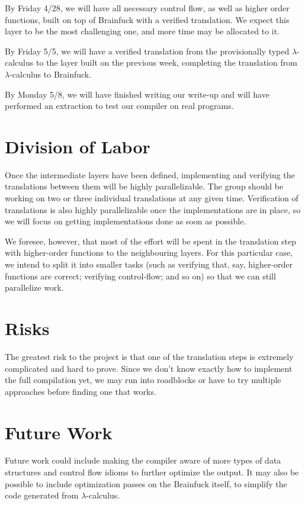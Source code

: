 \documentclass[letterpaper,twocolumn,11pt]{article}
\begin{document}
By Friday 4/28, we will have all necessary control flow, as well as higher order functions, built on top of Brainfuck with a verified translation. We expect this layer to be the most challenging one, and more time may be allocated to it.

By Friday 5/5, we will have a verified translation from the provisionally typed $\lambda$-calculus to the layer built on the previous week, completing the translation from $\lambda$-calculus to Brainfuck.

By Monday 5/8, we will have finished writing our write-up and will have performed an extraction to test our compiler on real programs.

\section{Division of Labor}
Once the intermediate layers have been defined, implementing and verifying the translations between them will be highly parallelizable. The group should be working on two or three individual translations at any given time. Verification of translations is also highly parallelizable once the implementations are in place, so we will focus on getting implementations done as soon as possible.

We foresee, however, that most of the effort will be spent in the translation step with higher-order functions to the neighbouring layers. For this particular case, we intend to split it into smaller tasks (such as verifying that, say, higher-order functions are correct; verifying control-flow; and so on) so that we can still parallelize work.

\section{Risks}
The greatest risk to the project is that one of the translation steps is extremely complicated and hard to prove. Since we don't know exactly how to implement the full compilation yet, we may run into roadblocks or have to try multiple approaches before finding one that works.

\section{Future Work}
Future work could include making the compiler aware of more types of data structures and control flow idioms to further optimize the output. It may also be possible to include optimization passes on the Brainfuck itself, to simplify the code generated from $\lambda$-calculus.

{\footnotesize 
}
\end{document}
